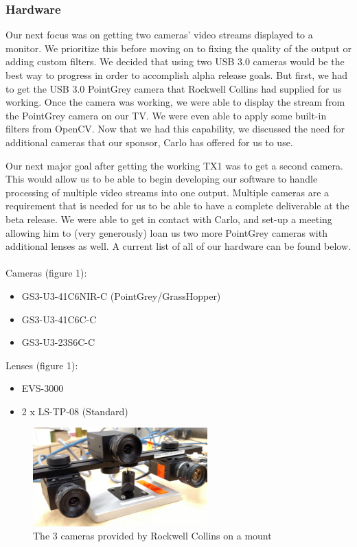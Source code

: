 \documentclass[letterpaper,10pt,titlepage]{IEEEtran}
\begin{document}
   \subsubsection{Hardware}
   Our next focus was on getting two cameras' video streams displayed to a monitor. We prioritize this before moving on to fixing the quality of the output or adding custom filters. We decided that using two USB 3.0 cameras would be the best way to progress in order to accomplish alpha release goals. But first, we had to get the USB 3.0 PointGrey camera that Rockwell Collins had supplied for us working. Once the camera was working, we were able to display the stream from the PointGrey camera on our TV. We were even able to apply some built-in filters from OpenCV. Now that we had this capability, we discussed the need for additional cameras that our sponsor, Carlo has offered for us to use.\\
   \par
Our next major goal after getting the working TX1 was to get a second camera. This would allow us to be able to begin developing our software to handle processing of multiple video streams into one output. Multiple cameras are a requirement that is needed for us to be able to have a complete deliverable at the beta release. We were able to get in contact with Carlo, and set-up a meeting allowing him to (very generously) loan us two more PointGrey cameras with additional lenses as well. A current list of all of our hardware can be found below. \\
	\\Cameras (figure 1):  
    		\begin{itemize}
		\item GS3-U3-41C6NIR-C (PointGrey/GrassHopper)
		\item GS3-U3-41C6C-C
		\item GS3-U3-23S6C-C\\
		\end{itemize}
	Lenses (figure 1): 
		\begin{itemize}
		\item EVS-3000 
		\item 2 x LS-TP-08 (Standard)\\
		\end{itemize}
		
\begin{figure}[!ht]
  \caption{The 3 cameras provided by Rockwell Collins on a mount}
	  \centering
		    \includegraphics[width=0.6\textwidth,natwidth=610,natheight=642]{images/IMG_20160210_131527329.jpg}
				\end{figure}
				
\end{document}
